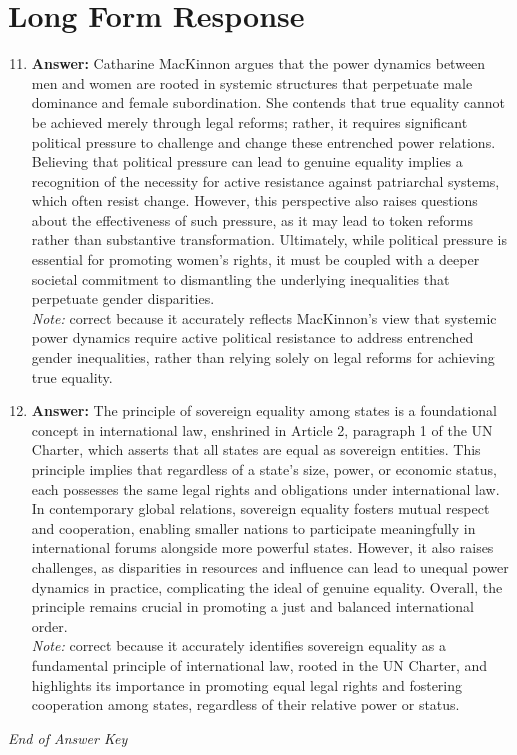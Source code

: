 \documentclass[12pt]{article}
\begin{document}
\section*{Long Form Response}
\begin{enumerate}[label=\arabic*.]
\setcounter{enumi}{10}
\item \textbf{Answer:} Catharine MacKinnon argues that the power dynamics between men and women are rooted in systemic structures that perpetuate male dominance and female subordination. She contends that true equality cannot be achieved merely through legal reforms; rather, it requires significant political pressure to challenge and change these entrenched power relations. Believing that political pressure can lead to genuine equality implies a recognition of the necessity for active resistance against patriarchal systems, which often resist change. However, this perspective also raises questions about the effectiveness of such pressure, as it may lead to token reforms rather than substantive transformation. Ultimately, while political pressure is essential for promoting women's rights, it must be coupled with a deeper societal commitment to dismantling the underlying inequalities that perpetuate gender disparities.
\\ \textit{Note:} correct because it accurately reflects MacKinnon's view that systemic power dynamics require active political resistance to address entrenched gender inequalities, rather than relying solely on legal reforms for achieving true equality.
\item \textbf{Answer:} The principle of sovereign equality among states is a foundational concept in international law, enshrined in Article 2, paragraph 1 of the UN Charter, which asserts that all states are equal as sovereign entities. This principle implies that regardless of a state's size, power, or economic status, each possesses the same legal rights and obligations under international law. In contemporary global relations, sovereign equality fosters mutual respect and cooperation, enabling smaller nations to participate meaningfully in international forums alongside more powerful states. However, it also raises challenges, as disparities in resources and influence can lead to unequal power dynamics in practice, complicating the ideal of genuine equality. Overall, the principle remains crucial in promoting a just and balanced international order.
\\ \textit{Note:} correct because it accurately identifies sovereign equality as a fundamental principle of international law, rooted in the UN Charter, and highlights its importance in promoting equal legal rights and fostering cooperation among states, regardless of their relative power or status.
\end{enumerate}

\vfill
\noindent\textit{End of Answer Key}
\end{document}
